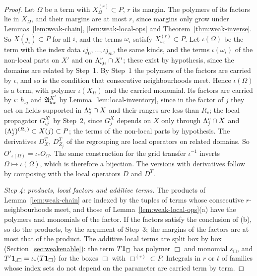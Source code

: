 \begin{proof}
Let $\Omega$ be a term with $X_\Omega^{(r)}\subset P$, $r$ its margin. The polymers of its factors lie in $X_\Omega$, and their margins are at most $r$, since margins only grow under Lemmas~\ref{lem:weak-chain}, \ref{lem:weak-local-ops} and Theorem~\ref{thm:weak-inverse}. So $X(j_i)\subset P$ for all $i$, and the terms $\omega_i$ satisfy $X_{\omega_i}^{(r)}\subset P$. Let $\iota(\Omega)$ be the term with the index data $\iota j_0,\dots,\iota j_m$, the same kinds, and the terms $\iota(\omega_i)$ of the non-local parts on $X'$ and on $\Lambda^v_{\iota j_i}\cap X'$; these exist by hypothesis, since the domains are related by Step~1. By Step~1 the polymers of the factors are carried by $\iota$, and so is the condition that consecutive neighbourhoods meet. Hence $\iota(\Omega)$ is a term, with polymer $\iota(X_\Omega)$ and the carried monomial. Its factors are carried by $\iota$: $h_{\iota j}$ and $\mathfrak A^{X'}_{\rm loc}$ by Lemma~\ref{lem:local-inventory}, since in the factor of $j$ they act on fields supported in $\Lambda^v_j\cap X$ and their ranges are less than $R_v$; the local propagator $G^{X'}_{\iota j}$ by Step~2, since $G^X_j$ depends on $X$ only through $\Lambda^v_j\cap X$ and $(\Lambda^v_j)^{(R_v)}\subset X(j)\subset P$; the terms of the non-local parts by hypothesis. The derivatives $D^T_X$, $D^T_{Z_j}$ of the regrouping are local operators on related domains. So $O'_{\iota(\Omega)}=\iota_*O_\Omega$. The same construction for the grid transfer $\iota^{-1}$ inverts $\Omega\mapsto\iota(\Omega)$, which is therefore a bijection. The versions with derivatives follow by composing with the local operators $D$ and $D^T$.

\emph{Step 4: products, local factors and additive terms.} The products of Lemma~\ref{lem:weak-chain} are indexed by the tuples of terms whose consecutive $r$-neighbourhoods meet, and those of Lemma~\ref{lem:weak-local-ops}(a) have the polymers and monomials of the factor. If the factors satisfy the conclusion of (b), so do the products, by the argument of Step~3; the margins of the factors are at most that of the product. The additive local terms are split box by box (Section~\ref{sec:weakenable}): the term $T\mathbf 1_\Box$ has polymer $\Box$ and monomial $s_\Box$, and $T'\mathbf 1_{\iota\Box}=\iota_*(T\mathbf 1_\Box)$ for the boxes $\Box$ with $\Box^{(r)}\subset P$. Integrals in $r$ or $t$ of families whose index sets do not depend on the parameter are carried term by term.


\end{proof}
